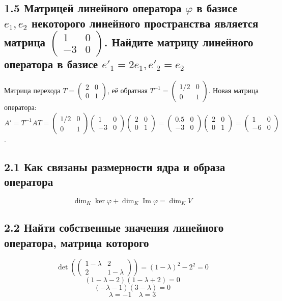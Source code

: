 \documentclass{article}
\begin{document}
\subsection*{1.5 Матрицей линейного оператора \( \varphi \) в базисе \( e_1, e_2 \) некоторого линейного пространства является матрица \( \begin{pmatrix} 1 & 0 \\ -3 & 0 \end{pmatrix} \). Найдите матрицу линейного оператора в базисе \( e'_1 = 2e_1, e'_2 = e_2 \)}
Матрица перехода \( T = \begin{pmatrix} 2 & 0 \\ 0 & 1 \end{pmatrix} \), её обратная \( T^{-1} = \begin{pmatrix} 1/2 & 0 \\ 0 & 1 \end{pmatrix} \).
Новая матрица оператора: \( A' = T^{-1} A T = \begin{pmatrix} 1/2 & 0 \\ 0 & 1 \end{pmatrix} \begin{pmatrix} 1 & 0 \\ -3 & 0 \end{pmatrix} \begin{pmatrix} 2 & 0 \\ 0 & 1 \end{pmatrix} = \begin{pmatrix} 0.5 & 0 \\ -3 & 0 \end{pmatrix} \begin{pmatrix} 2 & 0 \\ 0 & 1 \end{pmatrix} = \begin{pmatrix} 1 & 0 \\ -6 & 0 \end{pmatrix} \).

\subsection*{2.1 Как связаны размерности ядра и образа оператора}
\[\dim_K \ker \varphi + \dim_K \operatorname{Im} \varphi = \dim_K V\]

\subsection*{2.2 Найти собственные значения линейного оператора, матрица которого}
\[\det \left( \begin{pmatrix}
1-\lambda & 2 \\
2 & 1-\lambda
\end{pmatrix} \right) = (1-\lambda)^2 - 2^2 = 0\]
\[(1-\lambda - 2)(1-\lambda + 2) = 0\]
\[(-\lambda - 1)(3-\lambda) = 0\]
\[\lambda = -1 \quad \lambda = 3\]
\end{document}
